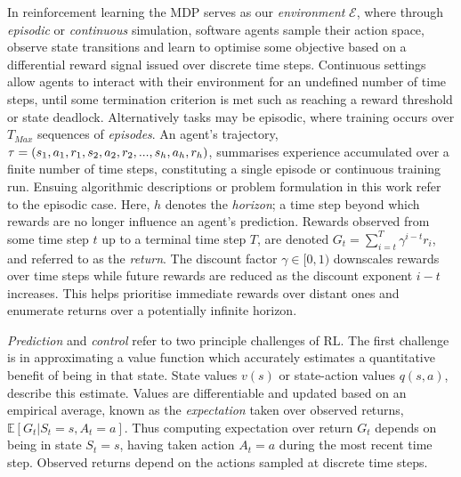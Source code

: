 \documentclass[runningheads]{llncs}
\begin{document}

In reinforcement learning the MDP serves as our \emph{environment} $\mathcal{E}$, where through \emph{episodic} or \emph{continuous} simulation, software agents sample their action space, observe state transitions and learn to optimise some objective based on a differential reward signal issued over discrete time steps. Continuous settings allow agents to interact with their environment for an undefined number of time steps, until some termination criterion is met such as reaching a reward threshold or state deadlock. Alternatively tasks may be episodic, where training occurs over $T_{Max}$ sequences of \emph{episodes}. An agent's trajectory, $\tau = (s_1, a_1, r_1,  s_2, a_2, r_2,...,s_h,\\ a_h, r_h)$, summarises experience accumulated over a finite number of time steps, constituting a single episode or continuous training run. Ensuing algorithmic descriptions or problem formulation in this work refer to the episodic case. Here, $h$ denotes the \emph{horizon}; a time step beyond which rewards are no longer influence an agent's prediction. Rewards observed from some time step $t$ up to a terminal time step $T$, are denoted $G_{t} = \sum_{i=t}^{T}\gamma^{i-t}r_{i}$, and referred to as the \emph{return}. The discount factor $\gamma \in [0,1)$ downscales rewards over time steps while future rewards are reduced as the discount exponent $i-t$ increases. This helps prioritise immediate rewards over distant ones and enumerate returns over a potentially infinite horizon. 

\emph{Prediction} and \emph{control} refer to two principle challenges of RL. The first challenge is in approximating a value function which accurately estimates a quantitative benefit of being in that state. State values $v(s)$ or state-action values $q(s,a)$, describe this estimate. Values are differentiable and updated based on an empirical average, known as the \emph{expectation} taken over observed returns, $\mathbb{E}[G_t | S_t = s, A_t = a]$. Thus computing expectation over return $G_t$ depends on being in state $S_t = s$, having taken action $A_t = a$ during the most recent time step. Observed returns depend on the actions sampled at discrete time steps. 
\end{document}
